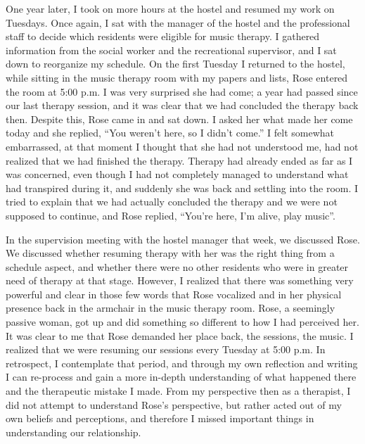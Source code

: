 \documentclass[authordate, empirical]{jote-new-article}
\begin{document}
One year later, I took on more hours at the hostel and resumed my work on Tuesdays. Once again, I sat with the manager of the hostel and the professional staff to decide which residents were eligible for music therapy. I gathered information from the social worker and the recreational supervisor, and I sat down to reorganize my schedule. On the first Tuesday I returned to the hostel, while sitting in the music therapy room with my papers and lists, Rose entered the room at 5:00 p.m. I was very surprised she had come; a year had passed since our last therapy session, and it was clear that we had concluded the therapy back then. Despite this, Rose came in and sat down. I asked her what made her come today and she replied, “You weren't here, so I didn't come.” I felt somewhat embarrassed, at that moment I thought that she had not understood me, had not realized that we had finished the therapy. Therapy had already ended as far as I was concerned, even though I had not completely managed to understand what had transpired during it, and suddenly she was back and settling into the room. I tried to explain that we had actually concluded the therapy and we were not supposed to continue, and Rose replied, “You're here, I'm alive, play music”.



In the supervision meeting with the hostel manager that week, we discussed Rose. We discussed whether resuming therapy with her was the right thing from a schedule aspect, and whether there were no other residents who were in greater need of therapy at that stage. However, I realized that there was something very powerful and clear in those few words that Rose vocalized and in her physical presence back in the armchair in the music therapy room. Rose, a seemingly passive woman, got up and did something so different to how I had perceived her. It was clear to me that Rose demanded her place back, the sessions, the music. I realized that we were resuming our sessions every Tuesday at 5:00 p.m. In retrospect, I contemplate that period, and through my own reflection and writing I can re-process and gain a more in-depth understanding of what happened there and the therapeutic mistake I made. From my perspective then as a therapist, I did not attempt to understand Rose's perspective, but rather acted out of my own beliefs and perceptions, and therefore I missed important things in understanding our relationship.
\end{document}
